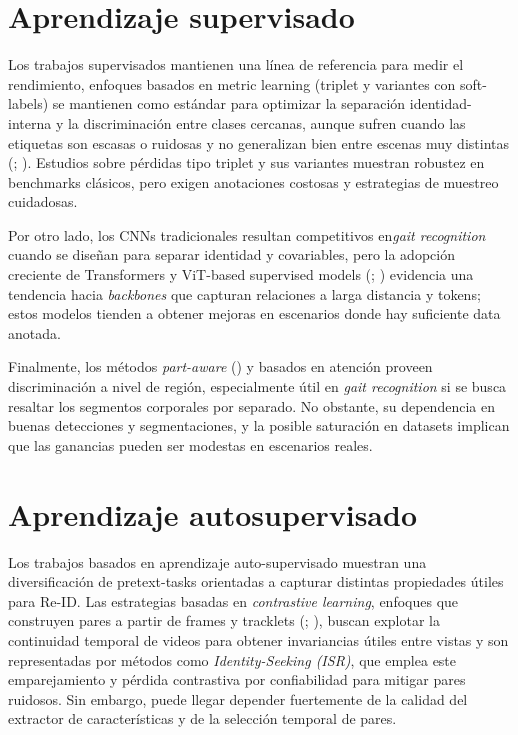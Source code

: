 \section{Aprendizaje supervisado}

Los trabajos supervisados mantienen una línea de referencia para medir el rendimiento, enfoques basados en metric learning (triplet y variantes con soft-labels) se mantienen como estándar para optimizar la separación identidad-interna y la discriminación entre clases cercanas, aunque sufren cuando las etiquetas son escasas o ruidosas y no generalizan bien entre escenas muy distintas (\cite{Lin2020Softened}; \cite{Guo2023TripletContrastive}). Estudios sobre pérdidas tipo triplet y sus variantes muestran robustez en benchmarks clásicos, pero exigen anotaciones costosas y estrategias de muestreo cuidadosas. 

Por otro lado, los CNNs tradicionales resultan competitivos en\textit{gait recognition} cuando se diseñan para separar identidad y covariables, pero la adopción creciente de Transformers y ViT-based supervised models (\cite{Huang2025PersonViT}; \cite{He2025TransReID}) evidencia una tendencia hacia \textit{backbones} que capturan relaciones a larga distancia y tokens; estos modelos tienden a obtener mejoras en escenarios donde hay suficiente data anotada.

Finalmente, los métodos \textit{part-aware} (\cite{Yang2020DevilDetails}) y basados en atención proveen discriminación a nivel de región, especialmente útil en \textit{gait recognition} si se busca resaltar los segmentos corporales por separado. No obstante, su dependencia en buenas detecciones y segmentaciones, y la posible saturación en datasets implican que las ganancias pueden ser modestas en escenarios reales.

\section{Aprendizaje autosupervisado}

Los trabajos basados en aprendizaje auto-supervisado muestran una diversificación de pretext-tasks orientadas a capturar distintas propiedades útiles para Re-ID. Las estrategias basadas en \textit{contrastive learning}, enfoques que construyen pares a partir de frames y tracklets (\cite{Zheng2022PASS}; \cite{Dou2023IdentitySeeking}), buscan explotar la continuidad temporal de videos para obtener invariancias útiles entre vistas y son representadas por métodos como \textit{Identity-Seeking (ISR)}, que emplea este emparejamiento y pérdida contrastiva por confiabilidad para mitigar pares ruidosos. Sin embargo, puede llegar depender fuertemente de la calidad del extractor de características y de la selección temporal de pares.

